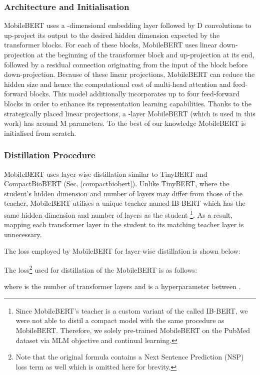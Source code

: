 \documentclass{article}
\begin{document}
\subsubsection{Architecture and Initialisation}
MobileBERT uses a -dimensional embedding layer followed by D convolutions to up-project its output to the desired hidden dimension expected by the transformer blocks. For each of these blocks, MobileBERT uses linear down-projection at the beginning of the transformer block and up-projection at its end, followed by a residual connection originating from the input of the block before down-projection. Because of these linear projections, MobileBERT can reduce the hidden size and hence the computational cost of multi-head attention and feed-forward blocks. This model additionally incorporates up to four feed-forward blocks in order to enhance its representation learning capabilities. Thanks to the strategically placed linear projections, a -layer MobileBERT (which is used in this work) has around M parameters. To the best of our knowledge MobileBERT is initialised from scratch.

\subsubsection{Distillation Procedure}
MobileBERT uses layer-wise distillation similar to TinyBERT \citep{jiao-etal-2020-tinybert} and CompactBioBERT (Sec. \ref{compactbiobert}). Unlike TinyBERT, where the student's hidden dimension and number of layers may differ from those of the teacher, MobileBERT utilises a unique teacher named IB-BERT which has the same hidden dimension and number of layers as the student \footnote{Since MobileBERT's teacher is a custom variant of the  called IB-BERT, we were not able to distil a compact model with the same procedure as MobileBERT. Therefore, we solely pre-trained MobileBERT on the PubMed dataset via MLM objective and continual learning.}. As a result, mapping each transformer layer in the student to its matching teacher layer is unnecessary.

The loss employed by MobileBERT for layer-wise distillation is shown below: 



The {loss}\footnote{Note that the original formula contains a Next Sentence Prediction (NSP) loss term as well which is omitted here for brevity.} used for distillation of the MobileBERT is as follows:


where  is the number of transformer layers and   is a hyperparameter between .
\end{document}
